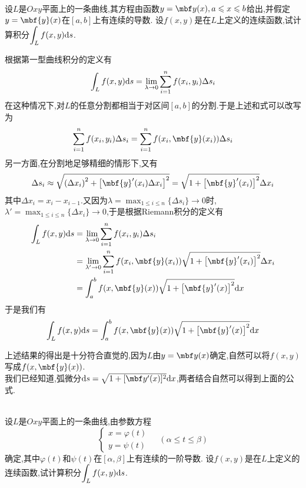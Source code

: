 \documentclass{ctexart}
\begin{document}
\begin{problem}[1.3 平面第一型曲线积分的计算I]
    \\设$L$是$Oxy$平面上的一条曲线,其方程由函数$y=\mbf y(x),a\leqslant x\leqslant b$给出,并假定$y=\mbf{y}(x)$在$[a,b]$上有连续的导数.%
    设$f(x,y)$是在$L$上定义的连续函数,试计算积分$\displaystyle\int_{L}f(x,y)\mathrm{d} s$.
\end{problem}
\begin{solution}
    根据第一型曲线积分的定义有
    \[\int_{L}f(x,y)\mathrm{d} s=\lim_{\lambda\to0}\sum_{i=1}^{n}f(x_i,y_i)\Delta s_i\]
    在这种情况下,对$L$的任意分割都相当于对区间$[a,b]$的分割.于是上述和式可以改写为
    \[\sum_{i=1}^{n}f(x_i,y_i)\Delta s_i=\sum_{i=1}^{n}f(x_i,\mbf{y}(x_i))\Delta s_i\]
    另一方面,在分割地足够精细的情形下,又有
    \[\Delta s_i\approx\sqrt{\left(\Delta x_i\right)^2+\left[\mbf{y}'(x_i)\Delta x_i\right]^2}=\sqrt{1+\left[\mbf{y}'(x_i)\right]^2}\Delta x_i\]
    其中$\Delta x_i=x_i-x_{i-1}$.又因为$\displaystyle\lambda=\max_{1\leqslant i\leqslant n}\{\Delta s_i\}\to0$时,$\displaystyle\lambda'=\max_{1\leqslant i\leqslant n}\{\Delta x_i\}\to0$,于是根据Riemann积分的定义有
    \[\begin{aligned}
        \int_{L}f(x,y)\di s
        &= \lim_{\lambda\to0}\sum_{i=1}^{n}f(x_i,y_i)\Delta s_i \\
        &= \lim_{\lambda'\to0}\sum_{i=1}^{n}f(x_i,\mbf{y}(x_i))\sqrt{1+\left[\mbf{y}'(x_i)\right]^2}\Delta x_i \\
        &= \int_a^bf(x,\mbf{y}(x))\sqrt{1+\left[\mbf{y}'(x)\right]^2}\di x
    \end{aligned}\]
    于是我们有
    \[\int_{L}f(x,y)\di s=\int_a^bf(x,\mbf{y}(x))\sqrt{1+\left[\mbf{y}'(x)\right]^2}\di x\]
\end{solution}\noindent
上述结果的得出是十分符合直觉的,因为$L$由$y=\mbf y(x)$确定,自然可以将$f(x,y)$写成$f(x,\mbf{y}(x))$.\\
我们已经知道,弧微分$\di s=\sqrt{1+[\mbf y'(x)]^2}\di x$,两者结合自然可以得到上面的公式.
\begin{problem}[1.4 平面第一型曲线积分的计算II]
    \\设$L$是$Oxy$平面上的一条曲线,由参数方程
    \[\left\{\begin{array}{l}
        x=\varphi(t)\\y=\psi(t)
    \end{array}\right.\ \ \ \ \ (\alpha\leqslant t\leqslant\beta)\]
    确定,其中$\varphi(t)$和$\psi(t)$在$[\alpha,\beta]$上有连续的一阶导数.%
    设$f(x,y)$是在$L$上定义的连续函数,试计算积分$\displaystyle\int_{L}f(x,y)\mathrm{d} s$.
\end{problem}
\end{document}
